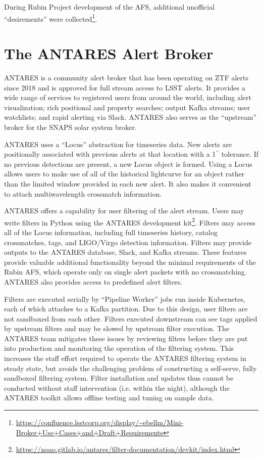 \documentclass[DM,authoryear,toc]{lsstdoc}
\begin{document}
During Rubin Project development of the AFS, additional unofficial ``desirements'' were collected\footnote{\url{https://confluence.lsstcorp.org/display/~ebellm/Mini-Broker+Use+Cases+and+Draft+Requirements}}.

\section{The ANTARES Alert Broker} \label{sec:antares}

ANTARES is a community alert broker that has been operating on ZTF alerts since 2018 and is approved for full stream access to LSST alerts.
It provides a wide range of services to registered users from around the world, including alert visualization; rich positional and property searches; output Kafka streams; user watchlists; and rapid alerting via Slack.
ANTARES also serves as the ``upstream'' broker for the SNAPS solar system broker.

ANTARES uses a ``Locus'' abstraction for timeseries data.
New alerts are positionally associated with previous alerts at that location with a 1$^{\prime\prime}$ tolerance.
If no previous detections are present, a new Locus object is formed.
Using a Locus allows users to make use of all of the historical lightcurve for an object rather than the limited window provided in each new alert.
It also makes it convenient to attach multiwavelength crossmatch information.

ANTARES offers a capability for user filtering of the alert stream.
Users may write filters in Python using the ANTARES development kit\footnote{\url{https://noao.gitlab.io/antares/filter-documentation/devkit/index.html}}. 
Filters may access all of the Locus information, including full timeseries history, catalog crossmatches, tags, and LIGO/Virgo detection information.
Filters may provide outputs to the ANTARES database, Slack, and Kafka streams.
These features provide valuable additional functionality beyond the minimal requirements of the Rubin AFS, which operate only on single alert packets with no crossmatching.
ANTARES also provides access to predefined alert filters.

Filters are executed serially by ``Pipeline Worker'' jobs run inside Kubernetes, each of which attaches to a Kafka partition.
Due to this design, user filters are not sandboxed from each other.
Filters executed downstream can see tags applied by upstream filters and may be slowed by upstream filter execution.
The ANTARES team mitigates these issues by reviewing filters before they are put into production and monitoring the operation of the filtering system.
This increases the staff effort required to operate the ANTARES filtering system in steady state, but avoids the challenging problem of constructing a self-serve, fully sandboxed filtering system.
Filter installation and updates thus cannot be conducted without staff intervention (i.e. within the night), although the ANTARES toolkit allows offline testing and tuning on sample data.
\end{document}
